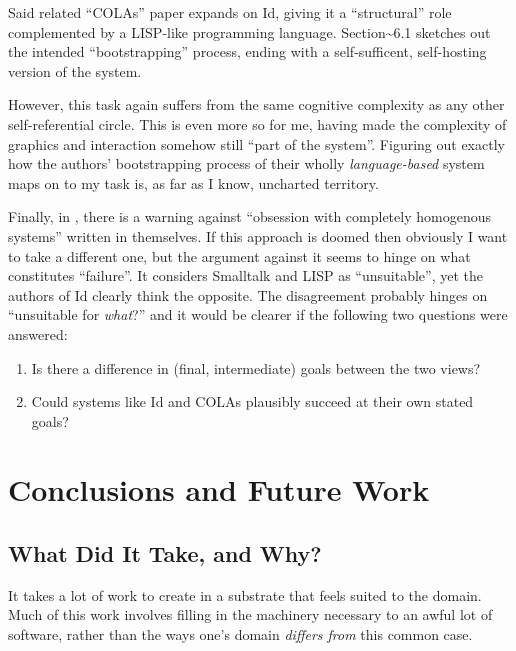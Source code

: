 Said related ``COLAs'' paper expands on Id{}, giving it a ``structural''
role complemented by a LISP-like programming language.
Section\textasciitilde{}6.1 sketches out the intended ``bootstrapping''
process, ending with a self-sufficent, self-hosting version of the
system.

However, this task again suffers from the same cognitive complexity as
any other self-referential circle. This is even more so for me, having
made the complexity of graphics and interaction somehow still ``part of
the system''. Figuring out exactly how the authors' bootstrapping
process of their wholly \emph{language-based} system maps on to my task
is, as far as I know, uncharted territory.

Finally, in \cite{crit-semprola}, there is a warning against ``obsession
with completely homogenous systems'' written in themselves. If this
approach is doomed then obviously I want to take a different one, but
the argument against it seems to hinge on what constitutes ``failure''.
It considers Smalltalk and LISP as ``unsuitable'', yet the authors of
Id{} clearly think the opposite. The disagreement probably hinges on
``unsuitable for \emph{what}?'' and it would be clearer if the following
two questions were answered:

\begin{enumerate}
\def\labelenumi{\arabic{enumi}.}
\tightlist
\item
  Is there a difference in (final, intermediate) goals between the two
  views?
\item
  Could systems like Id{} and COLAs plausibly succeed at their own
  stated goals?
\end{enumerate}

\hypertarget{conclusions-and-future-work}{%
\section{Conclusions and Future
Work}\label{conclusions-and-future-work}}

\hypertarget{what-did-it-take-and-why}{%
\subsection{What Did It Take, and Why?}\label{what-did-it-take-and-why}}

It takes a lot of work to create in a substrate that feels suited to the
domain. Much of this work involves filling in the machinery necessary to
an awful lot of software, rather than the ways one's domain
\emph{differs from} this common case.

